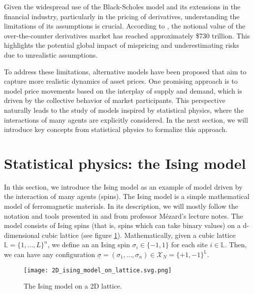 Given the widespread use of the Black-Scholes model and its extensions in the financial industry, particularly in the pricing of derivatives, understanding the limitations of its assumptions is crucial. According to \cite{bis}, the notional value of the over-the-counter derivatives market has reached approximately \$730 trillion. This highlights the potential global impact of mispricing and underestimating risks due to unrealistic assumptions.

To address these limitations, alternative models have been proposed that aim to capture more realistic dynamics of asset prices. One promising approach is to model price movements based on the interplay of supply and demand, which is driven by the collective behavior of market participants. This perspective naturally leads to the study of models inspired by statistical physics, where the interactions of many agents are explicitly considered. In the next section, we will introduce key concepts from statistical physics to formalize this approach.


\section{Statistical physics: the Ising model}
In this section, we introduce the Ising model as an example of model driven by the interaction of many agents (spins). The Ising model is a simple mathematical model of ferromagnetic materials. In its description, we will mostly follow the notation and tools presented in \cite{mezard_book} and from professor Mézard's lecture notes. The model consists of Ising spins (that is, spins which can take binary values) on a d-dimensional cubic lattice (see figure \ref{fig:ising_model}). Mathematically, given a cubic lattice $\mathbb{L}=\{1,\dots,L\}^n$, we define an an Ising spin $\sigma_i\in\{-1,1\}$ for each site $i\in\mathbb{L}$. Then, we can have any configuration $\underline{\sigma} = (\sigma_1,\dots,\sigma_n) \in \mathcal{X}_N=\{+1,-1\}^{\mathbb{L}}$.

\begin{figure}[h]
    \centering
    \texttt{[image: 2D\_ising\_model\_on\_lattice.svg.png]}
    \caption{The Ising model on a 2D lattice.}
    \label{fig:ising_model}
\end{figure}


